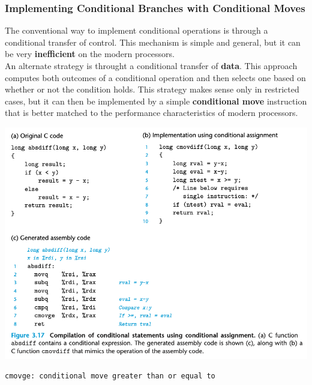 \documentclass[11pt]{article}
\begin{document}
\subsubsection{Implementing Conditional Branches with Conditional Moves}
\label{sec:org9e26071}
The conventional way to implement conditional operations is through a conditional transfer of control. This mechanism is simple and general, but it can be very \textbf{inefficient} on the modern processors.\\

An alternate strategy is throught a conditional transfer of \textbf{data}. This approach computes both outcomes of a conditional operation and then selects one based on whether or not the condition holds. This strategy makes sense only in restricted cases, but it can then be implemented by a simple \textbf{conditional move} instruction that is better matched to the performance characteristics of modern processors.\\

\begin{center}
\includegraphics[width=.9\linewidth]{pics/compilation-of-conditional-statements-using-conditional-assignment.png}
\end{center}

\begin{verbatim}
cmovge: conditional move greater than or equal to
\end{verbatim}
\end{document}
